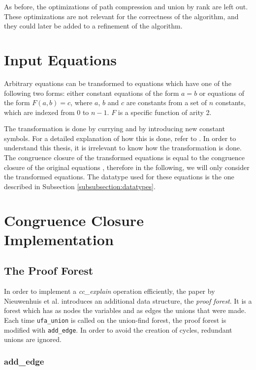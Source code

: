 As before, the optimizations of path compression and union by rank are left out. These optimizations are not relevant for the correctness of the algorithm, and they could later be added to a refinement of the algorithm.

\section{Input Equations}\label{section:inputequations}

Arbitrary equations can be transformed to equations which have one of the following two forms: either constant equations of the form $a = b$ or equations of the form $F(a,b) = c$, where $a$, $b$ and $c$ are constants from a set of $n$ constants, which are indexed from $0$ to $n-1$. $F$ is a specific function of arity 2.

The transformation is done by currying and by introducing new constant symbols. For a detailed explanation of how this is done, refer to \cite{Nieuwenhuis2}. In order to understand this thesis, it is irrelevant to know how the transformation is done.
The congruence closure of the transformed equations is equal to the congruence closure of the original equations \cite{Nieuwenhuis2}, therefore in the following, we will only consider the transformed equations.
The datatype used for these equations is the one described in Subsection \ref{subsubsection:datatypes}.

\section{Congruence Closure Implementation}

\subsection{The Proof Forest}

In order to implement a \emph{cc\_explain} operation efficiently, the paper by Nieuwenhuis et al. \cite{Nieuwenhuis} introduces an additional data structure, the \emph{proof forest}. It is a forest which has as nodes the variables and as edges the unions that were made. Each time \lstinline|ufa_union| is called on the union-find forest, the proof forest is modified with \lstinline|add_edge|. In order to avoid the creation of cycles, redundant unions are ignored.

\subsubsection{add\_edge}
\label{subsubsection:addedge}


